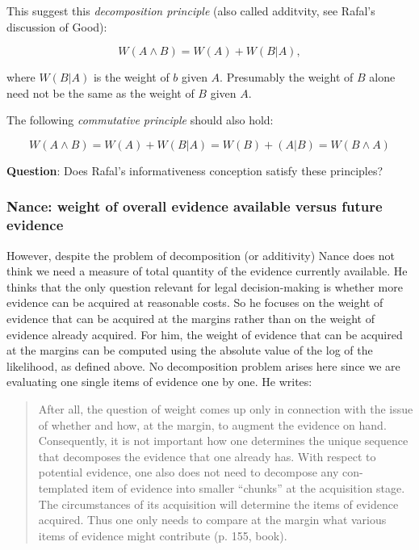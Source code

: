 \documentclass[
  10pt,
  dvipsnames,enabledeprecatedfontcommands]{scrartcl}
\begin{document}

This suggest this \textit{decomposition principle} (also called
additvity, see Rafal's discussion of Good):

\[W(A \wedge B) = W(A) + W(B | A),\]

where \(W(B | A)\) is the weight of \(b\) given \(A\). Presumably the
weight of \(B\) alone need not be the same as the weight of \(B\) given
\(A\).

The following \textit{commutative principle} should also hold:

\[W(A \wedge B) = W(A) + W(B | A)= W(B) + (A | B) = W(B \wedge A)\]

\textbf{Question}: Does Rafal's informativeness conception satisfy these
principles?


\hypertarget{nance-weight-of-overall-evidence-available-versus-future-evidence}{%
\subsubsection{Nance: weight of overall evidence available versus future
evidence}\label{nance-weight-of-overall-evidence-available-versus-future-evidence}}

However, despite the problem of decomposition (or additivity) Nance does
not think we need a measure of total quantity of the evidence currently
available. He thinks that the only question relevant for legal
decision-making is whether more evidence can be acquired at reasonable
costs. So he focuses on the weight of evidence that can be acquired at
the margins rather than on the weight of evidence already acquired. For
him, the weight of evidence that can be acquired at the margins can be
computed using the absolute value of the log of the likelihood, as
defined above. No decomposition problem arises here since we are
evaluating one single items of evidence one by one. He writes:

\begin{quote}
After all, the question of weight comes up only in connection with the issue of whether and how, at the margin, to augment the evidence on hand. Consequently, it is not important how one determines the unique sequence that decomposes the evidence that one already has. With respect to potential evidence, one also does not need to decompose any con- templated item of evidence into smaller “chunks” at the acquisition stage. The circumstances of its acquisition will determine the items of evidence acquired. Thus one only needs to compare at the margin what various items of evidence might contribute (p. 155, book).
\end{quote}
\end{document}
